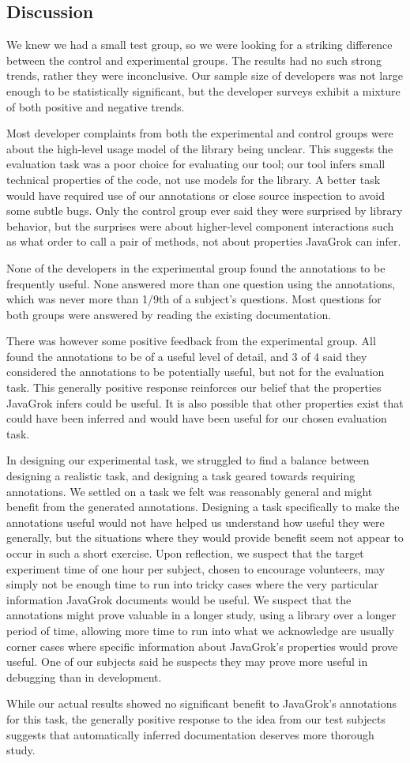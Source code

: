 \subsection{Discussion}
We knew we had a small test group, so we were looking for a striking difference
between the control and experimental groups.  The results had no such strong
trends, rather they were inconclusive.  Our sample size of developers was not
large enough to be statistically significant, but the developer surveys exhibit
a mixture of both positive and negative trends.

Most developer complaints from both the experimental and control groups were
about the high-level usage model of the library being unclear.  This suggests
the evaluation task was
a poor choice for evaluating our tool; our tool infers small technical
properties of the code, not use models for the library.  A better task would
have required use of our annotations or close source inspection to avoid some
subtle bugs.  Only the control group ever said they were surprised by library
behavior, but the surprises were about higher-level component interactions such
as what order to call a pair of methods, not about properties JavaGrok can
infer.

None of the developers in the experimental group found the annotations to be
frequently useful.  None answered more than one question using the
annotations, which was never more than 1/9th of a subject's questions.  Most
questions for both groups were answered by reading the existing documentation.

There was however some positive feedback from the experimental group.  All
found the annotations to be of a useful level of detail, and 3 of 4 said they
considered the annotations
to be potentially useful, but not for the evaluation task.  This generally
positive response reinforces our belief that the properties
JavaGrok infers could be useful.  It is also possible that other properties
exist that could have been inferred and would have been useful for our chosen
evaluation task.

In designing
our experimental task, we struggled to find a balance between designing a
realistic task, and designing a task geared towards requiring annotations.  We
settled on a task we felt was reasonably general and might benefit from the
generated annotations.  Designing a task specifically to make the annotations useful would
not have helped us understand how useful they were generally, but the situations
where they would provide benefit seem not appear to occur in such a short exercise.
Upon reflection, we suspect that the target experiment time of one hour per
subject, chosen to encourage volunteers, may simply not be enough time to run
into tricky cases where the very particular information JavaGrok documents would
be useful.  We suspect that the annotations might prove valuable in a longer
study, using a library over a longer period of time, allowing more time to run
into what we acknowledge are usually corner cases where specific information
about JavaGrok's properties would prove useful.  One of our subjects said he
suspects they may prove more useful in debugging than in development.

While our actual results showed no significant benefit to JavaGrok's annotations
for this task, the generally positive response to the idea from our test
subjects suggests that automatically inferred documentation deserves more
thorough study.

